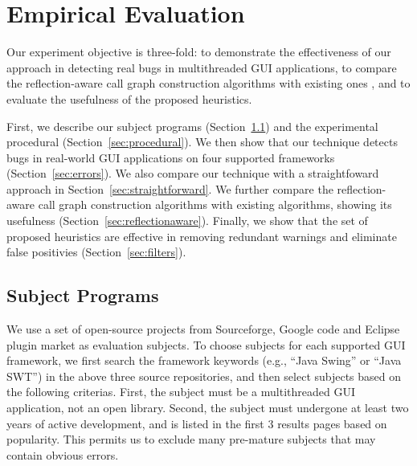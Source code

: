 \section{Empirical Evaluation}
\label{sec:evaluation}





Our experiment objective is three-fold: to demonstrate the effectiveness
of our approach in detecting real bugs in multithreaded GUI applications, to 
compare the reflection-aware call graph construction algorithms
with existing ones , and to evaluate the usefulness of the proposed 
 heuristics.  

First, we describe our subject programs (Section~\ref{sec:subjects}) and the experimental procedural (Section~\ref{sec:procedural}).
We then show that our technique detects bugs in real-world GUI applications on
four supported frameworks (Section~\ref{sec:errors}). We also compare our technique with
a straightfoward approach in Section~\ref{sec:straightforward}. We further compare the reflection-aware call graph
construction algorithms with existing algorithms, showing its usefulness (Section~\ref{sec:reflectionaware}).
 Finally, we show that the set of proposed heuristics are effective
in removing redundant warnings and eliminate false positivies (Section~\ref{sec:filters}). 



\subsection{Subject Programs}
\label{sec:subjects}

We use a set of open-source projects from Sourceforge, Google code and Eclipse plugin
market as evaluation subjects. To choose subjects for each supported GUI framework,
we first search the framework keywords (e.g., ``Java Swing'' or ``Java SWT'')
in the above three source repositories, and then select subjects based on the following
criterias. First, the subject must be a multithreaded GUI application, not
an open library. Second, the subject must undergone at least two years of active development,
and is listed in the first 3 results pages based on popularity. This permits us
to exclude many pre-mature subjects that may contain obvious errors.

